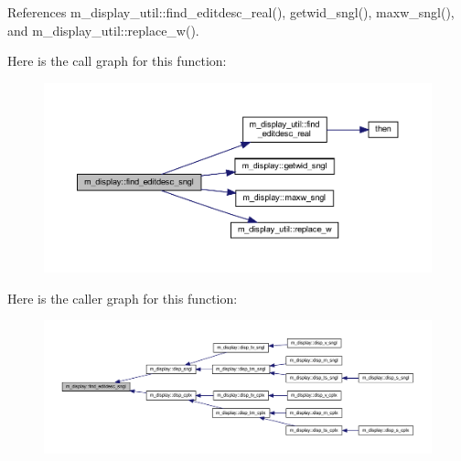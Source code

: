 References m\+\_\+display\+\_\+util\+::find\+\_\+editdesc\+\_\+real(), getwid\+\_\+sngl(), maxw\+\_\+sngl(), and m\+\_\+display\+\_\+util\+::replace\+\_\+w().

Here is the call graph for this function\+:
\nopagebreak
\begin{figure}[H]
\begin{center}
\leavevmode
\includegraphics[width=350pt]{namespacem__display_aa41974a4b32f6169cadb3da72991653f_cgraph}
\end{center}
\end{figure}
Here is the caller graph for this function\+:
\nopagebreak
\begin{figure}[H]
\begin{center}
\leavevmode
\includegraphics[width=350pt]{namespacem__display_aa41974a4b32f6169cadb3da72991653f_icgraph}
\end{center}
\end{figure}
\mbox{\label{namespacem__display_abfcfe1ce55c2ec6aa7a261f6039a19d4}} 
